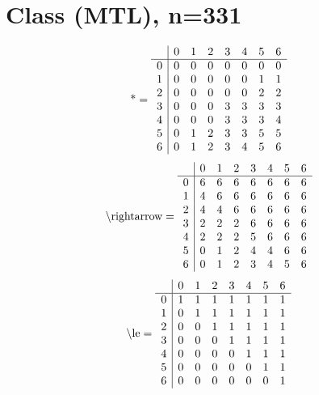 \documentclass[11pt]{article}
\begin{document}
\section{Class (MTL), n=331}
\[\text{*} = 
\begin{array}{r | r r r r r r r}
 & 0 & 1 & 2 & 3 & 4 & 5 & 6 \\ \hline
0 & 0 & 0 & 0 & 0 & 0 & 0 & 0 \\
1 & 0 & 0 & 0 & 0 & 0 & 1 & 1 \\
2 & 0 & 0 & 0 & 0 & 0 & 2 & 2 \\
3 & 0 & 0 & 0 & 3 & 3 & 3 & 3 \\
4 & 0 & 0 & 0 & 3 & 3 & 3 & 4 \\
5 & 0 & 1 & 2 & 3 & 3 & 5 & 5 \\
6 & 0 & 1 & 2 & 3 & 4 & 5 & 6 \\
\end{array}
\]
\[\text{\textbackslash rightarrow} = 
\begin{array}{r | r r r r r r r}
 & 0 & 1 & 2 & 3 & 4 & 5 & 6 \\ \hline
0 & 6 & 6 & 6 & 6 & 6 & 6 & 6 \\
1 & 4 & 6 & 6 & 6 & 6 & 6 & 6 \\
2 & 4 & 4 & 6 & 6 & 6 & 6 & 6 \\
3 & 2 & 2 & 2 & 6 & 6 & 6 & 6 \\
4 & 2 & 2 & 2 & 5 & 6 & 6 & 6 \\
5 & 0 & 1 & 2 & 4 & 4 & 6 & 6 \\
6 & 0 & 1 & 2 & 3 & 4 & 5 & 6 \\
\end{array}
\]
\[\text{\textbackslash le} = 
\begin{array}{r | r r r r r r r}
 & 0 & 1 & 2 & 3 & 4 & 5 & 6 \\ \hline
0 & 1 & 1 & 1 & 1 & 1 & 1 & 1 \\
1 & 0 & 1 & 1 & 1 & 1 & 1 & 1 \\
2 & 0 & 0 & 1 & 1 & 1 & 1 & 1 \\
3 & 0 & 0 & 0 & 1 & 1 & 1 & 1 \\
4 & 0 & 0 & 0 & 0 & 1 & 1 & 1 \\
5 & 0 & 0 & 0 & 0 & 0 & 1 & 1 \\
6 & 0 & 0 & 0 & 0 & 0 & 0 & 1 \\
\end{array}
\]
\end{document}

